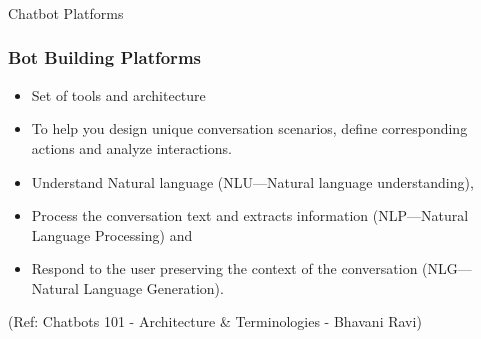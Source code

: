 \begin{frame}[fragile]\frametitle{}
\begin{center}
{\Large Chatbot Platforms}
\end{center}
\end{frame}

 \begin{frame}[fragile]\frametitle{Bot Building Platforms}
\begin{itemize}
\item Set of tools and architecture
\item To help you design unique conversation scenarios, define corresponding actions and analyze interactions.
\item Understand Natural language (NLU—Natural language understanding), 
\item Process the conversation text and extracts information (NLP—Natural Language Processing) and \item Respond to the user preserving the context of the conversation (NLG—Natural Language Generation).
\end{itemize}

{\tiny (Ref: Chatbots 101 - Architecture \& Terminologies -  Bhavani Ravi)}

\end{frame}








